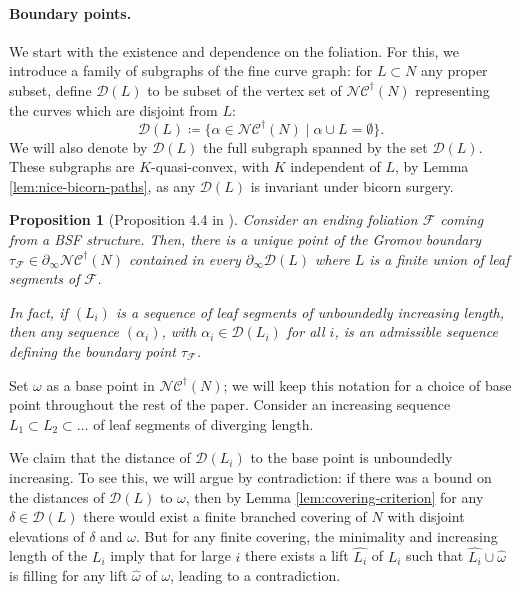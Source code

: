 \documentclass[10pt,a4paper]{amsart}
\newtheorem{proposition}[theorem]{Proposition}
\newcommand{\fncg}{\mathcal{NC}^\dagger}
\begin{document}
\paragraph{Boundary points.} 
We start with the existence and dependence on the foliation.
For this, we introduce a family of subgraphs of the fine curve graph:
for $L\subset N$ any proper subset, define $\mathcal{D}(L)$ to be subset of the vertex set of $\fncg(N)$ representing the curves which are disjoint from $L$:
    \[ \mathcal{D}(L) \coloneqq \{\alpha \in \fncg(N) \mid \alpha \cup L = \emptyset \}. \]
We will also denote by $\mathcal{D}(L)$ the full subgraph spanned by the set $\mathcal{D}(L)$.
These subgraphs are $K$-quasi-convex, with $K$ independent of $L$, by Lemma \ref{lem:nice-bicorn-paths}, as any $\mathcal{D}(L)$ is invariant under bicorn surgery.

\begin{proposition}[Proposition 4.4 in \cite{BHW2}]\label{prop:foliations-give-bdary-pts}
Consider an ending foliation $\mathcal{F}$ coming from a BSF structure.
Then, there is a unique point of the Gromov boundary $\tau_\mathcal{F}\in \partial_\infty\fncg(N)$ contained in every $\partial_\infty \mathcal{D}(L)$ where $L$ is a finite union of leaf segments of $\mathcal{F}$.

In fact, if $(L_i)$ is a sequence of leaf segments of unboundedly increasing length, then any sequence $(\alpha_i)$, with $\alpha_i \in \mathcal{D}(L_i)$ for all $i$, is an admissible sequence defining the boundary point $\tau_\mathcal{F}$.
\end{proposition}

Set $\omega$ as a base point in $\fncg(N)$; 
we will keep this notation for a choice of base point throughout the rest of the paper.
Consider an increasing sequence $L_1 \subset L_2 \subset \dots$ of leaf segments of diverging length.

We claim that the distance of $\mathcal{D}(L_i)$ to the base point is unboundedly increasing.
To see this, we will argue by contradiction:
if there was a bound on the distances of $\mathcal{D}(L)$ to $\omega$, then by Lemma \ref{lem:covering-criterion} for any $ \delta \in \mathcal{D}(L) $ there would exist a finite branched covering of $N$ with disjoint elevations of $\delta$ and $\omega$.
But for any finite covering, the minimality and increasing length of the $L_i$ imply that for large $i$ there exists a lift $\hat{L_i}$ of $L_i$ such that $\hat{L_i}\cup \hat{\omega}$ is filling for any lift $\hat{\omega}$ of $\omega$, leading to a contradiction.
\end{document}
